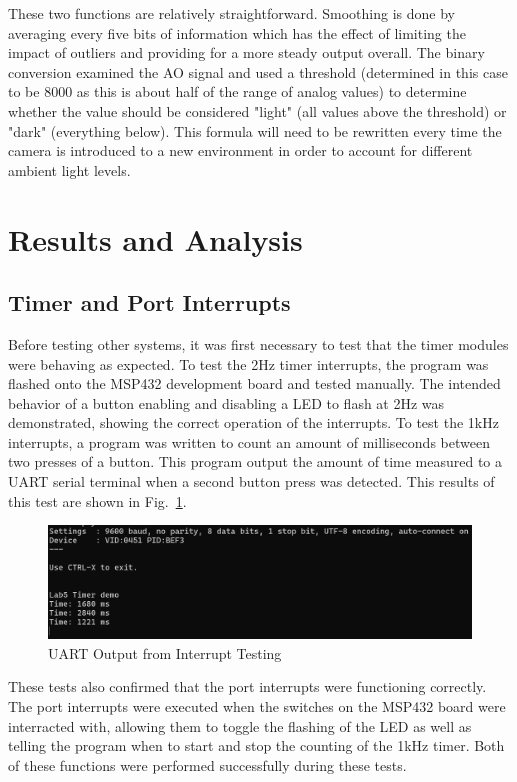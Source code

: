 \documentclass[conference]{IEEEtran}
\begin{document}
These two functions are relatively straightforward. Smoothing is done by
averaging every five bits of information which has the effect of limiting the
impact of outliers and providing for a more steady output overall. The binary
conversion examined the AO signal and used a threshold (determined in this
case to be 8000 as this is about half of the range of analog values) to
determine whether the value should be considered "light" (all values above the
threshold) or "dark" (everything below). This formula will need to be
rewritten every time the camera is introduced to a new environment in order to
account for different ambient light levels.

\section{Results and Analysis}

\subsection{Timer and Port Interrupts}

Before testing other systems, it was first necessary to test that the timer
modules were behaving as expected. To test the 2Hz timer interrupts, the
program was flashed onto the MSP432 development board and tested manually.
The intended behavior of a button enabling and disabling a LED to flash at
2Hz was demonstrated, showing the correct operation of the interrupts. To
test the 1kHz interrupts, a program was written to count an amount of
milliseconds between two presses of a button. This program output the amount
of time measured to a UART serial terminal when a second button press was
detected. This results of this test are shown in Fig.~\ref{part1terminal}.

\begin{figure}
    \centering
    \includegraphics[width=\linewidth,decodearray={1 0 1 0 1 0}]{images/part1terminal.png}
    \caption{UART Output from Interrupt Testing}
    \label{part1terminal}
\end{figure}

These tests also confirmed that the port interrupts were functioning
correctly. The port interrupts were executed when the switches on the
MSP432 board were interracted with, allowing them to toggle the flashing
of the LED as well as telling the program when to start and stop the
counting of the 1kHz timer. Both of these functions were performed
successfully during these tests.
\end{document}
